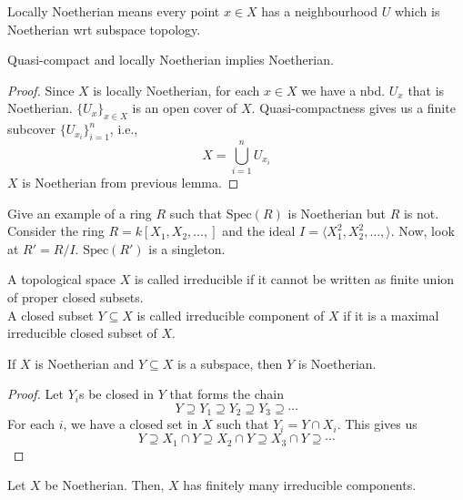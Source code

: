 \documentclass[oneside, 12pt]{scrbook}
\newcommand{\spec}{\mathrm{Spec}}
\theoremstyle{theorem}
\begin{document}
\begin{definition}
Locally Noetherian means every point $x\in X$ has a neighbourhood $U$ which is Noetherian wrt subspace topology.
\end{definition}

\begin{lemma}
Quasi-compact and locally Noetherian implies Noetherian.
\end{lemma}

\begin{proof}
Since $X$ is locally Noetherian, for each $x\in X$ we have a nbd. $U_{x}$ that is Noetherian. $\{U_{x}\}_{x \in X}$ is an open cover of $X$. Quasi-compactness gives us a finite subcover $\{U_{x_{i}}\}_{i=1}^n$, i.e., $$X = \bigcup_{i=1}^n U_{x_{i}}$$ $X$ is Noetherian from previous lemma.
\end{proof}

\begin{exercise}
Give an example of a ring $R$ such that $\spec(R)$ is Noetherian but $R$ is not. \\

Consider the ring $R=k[X_{1}, X_{2}, \hdots , ]$ and the ideal $I = \langle X_{1}^2 , X_{2}^2 , \hdots , \rangle$. Now, look at $R'=R/I$. $\spec(R')$ is a singleton. 
\end{exercise}

\begin{definition}
A topological space $X$ is called irreducible if it cannot be written as finite union of proper closed subsets. \\

A closed subset $Y \subseteq X$ is called irreducible component of $X$ if it is a maximal irreducible closed subset of $X$.
\end{definition}

\begin{lemma}
If $X$ is Noetherian and $Y \subseteq X$ is a subspace, then $Y$ is Noetherian. 
\end{lemma}

\begin{proof}
Let $Y_{i}$s be closed in $Y$ that forms the chain $$Y \supseteq Y_{1} \supseteq Y_{2} \supseteq Y_{3} \supseteq \cdots $$ For each $i$, we have a closed set in $X$ such that $Y_{i} = Y \cap X_{i}$. This gives us $$Y \supseteq X_{1}\cap Y \supseteq X_{2}\cap Y \supseteq X_{3}\cap Y \supseteq \cdots $$
\end{proof}

\begin{lemma}
Let $X$ be Noetherian. Then, $X$ has finitely many irreducible components. 
\end{lemma}
\end{document}
